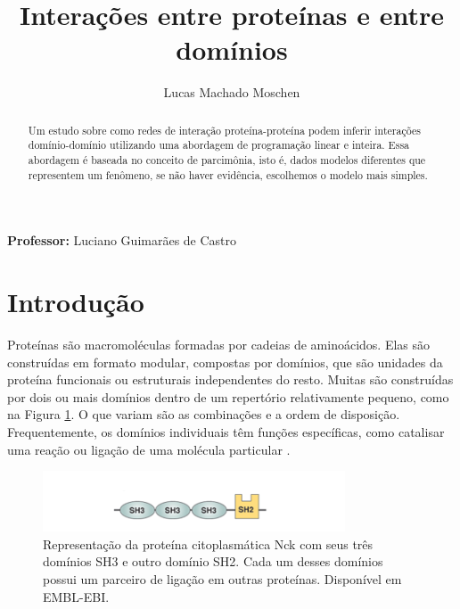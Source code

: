 \documentclass[11pt]{article}
\title{Interações entre proteínas e entre domínios}
\author{Lucas Machado Moschen}
\begin{document}
    
    \maketitle
    
\textbf{Professor:} Luciano Guimarães de Castro

\begin{abstract}
   Um estudo sobre como redes de interação proteína-proteína podem inferir
interações domínio-domínio utilizando uma abordagem de programação
linear e inteira. Essa abordagem é baseada no conceito de parcimônia, isto é, dados modelos diferentes que representem um fenômeno, se não haver evidência, escolhemos o modelo mais simples.
\end{abstract}


\tableofcontents

\section{Introdução}
\label{intro}

Proteínas são macromoléculas formadas por cadeias de aminoácidos. Elas
são construídas em formato modular, compostas por domínios, que são
unidades da proteína funcionais ou estruturais independentes do resto.
Muitas são construídas por dois ou mais domínios dentro de um repertório
relativamente pequeno, como na Figura \ref{fig1:p-d}. O que variam são as combinações e a ordem de
disposição. Frequentemente, os domínios individuais têm funções
específicas, como catalisar uma reação ou ligação de uma molécula
particular \cite{livro, embl}.

\begin{figure}
    \centering
    \includegraphics[width=0.8\textwidth]{images/figure-protein-domains.png}
    \caption{Representação da proteína citoplasmática Nck com seus três
    domínios SH3 e outro domínio SH2. Cada um desses domínios possui um
    parceiro de ligação em outras proteínas. Disponível em EMBL-EBI.}
    \label{fig1:p-d}
\end{figure}
\end{document}
